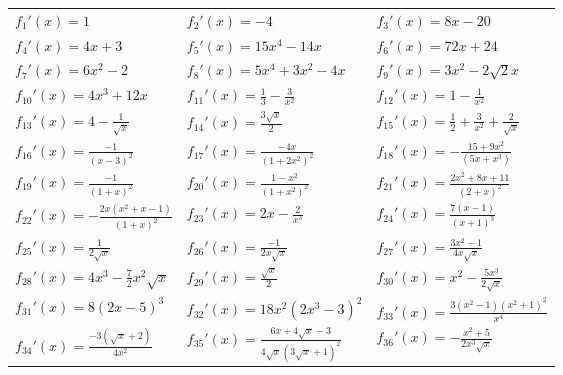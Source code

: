 \documentclass[oneside,12pt]{book}          %
\begin{document}
\begin{sol}
\begin{tabular}{p{} p{} p{}}
    $f_{1}'(x)=1$ &
    $f_{2}'(x)=-4 $ &
    $f_{3}'(x)=8x-20 $ \\
    $f_{4}'(x)=4x+3$  &
    $f_{5}'(x)=15x^4-14x $  &
    $f_{6}'(x)=72x+24 $ \\ 
    $f_{7}'(x)=6x^2-2 $ &
    $f_{8}'(x)=5x^4+3x^2-4x $ &
    $f_{9}'(x)=3x^2-2\sqrt{2}x $\\
    $f_{10}'(x)=4x^3+12x$ &

    $f_{11}'(x)=\frac{1}{3}-\frac{3}{x^2}$ &
    $f_{12}'(x)= 1-\frac{1}{x^2} $ \\ 
    $f_{13}'(x)=4-\frac{1}{\sqrt{x}} $ &    
    $f_{14}'(x)= \frac{3\sqrt{x}}{2}$ &
    $f_{15}'(x)=\frac{1}{2}+\frac{3}{x^2}+\frac{2}{\sqrt{x}}$ \\

    $f_{16}'(x)=\frac{-1}{(x-3)^2} $ &
    $f_{17}'(x)=\frac{-4x}{\left(1+2x^{2}\right)^2} $ &
    $f_{18}'(x)=-\frac{15+9x^2}{\left(5x+x^{3}\right)} $ \\

    $f_{19}'(x)=\frac{-1}{(1+x)^2} $ &
    $f_{20}'(x)=\frac{1-x^2}{\left(1+x^{2}\right)^2} $ &
    $f_{21}'(x)=\frac{2x^2+8x+11}{(2+x)^2} $ \\
    $f_{22}'(x)=-\frac{2x(x^2+x-1)}{(1+x)^2}$ &
    $f_{23}'(x)=2x-\frac{2}{x^3}$ &
    $f_{24}'(x)=\frac{7(x-1)}{(x+1)^3}$ \\
    $f_{25}'(x)=\frac{1}{2\sqrt{x}} $ &
    $f_{26}'(x)=\frac{-1}{2x\sqrt{x}} $ &
    $f_{27}'(x)=\frac{3x^2-1}{4x\sqrt{x}}$ \\

    $f_{28}'(x)=4x^3-\frac{7}{2}x^2\sqrt{x} $ &
    $f_{29}'(x)=\frac{\sqrt{x}}{2}$ &
    $f_{30}'(x)=x^2-\frac{5x^3}{2\sqrt{x}}$ \\

    $f_{31}'(x)=8(2x-5)^3$ &
    $f_{32}'(x)=18 x^2\left(2x^3-3\right)^2$ &
    $f_{33}'(x)=\frac{3(x^2-1)\left(x^2+1\right)^2}{x^4}$ \\

    $f_{34}'(x)=\frac{-3\left(\sqrt{x}+2\right)}{4x^2}$ &
    $f_{35}'(x)=\frac{6x+4\sqrt{x}-3}{4\sqrt{x}\left(3\sqrt{x}+1\right)^2} $ &
    $f_{36}'(x)=-\frac{x^2+5}{2x^3\sqrt{x}}$
\end{tabular}
\end{sol}
\end{document}
